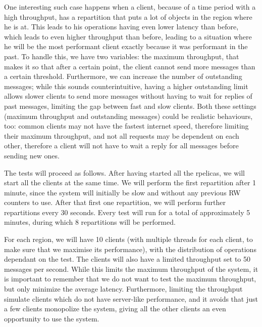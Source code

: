One interesting such case happens when a client, because of a time period with a high throughput, has a repartition that puts a lot of objects in the region where he is at. This leads to his operations having even lower latency than before, which leads to even higher throughput than before, leading to a situation where he will be the most performant client exactly because it was performant in the past. To handle this, we have two variables: the maximum throughput, that makes it so that after a certain point, the client cannot send more messages than a certain threshold. Furthermore, we can increase the number of outstanding messages; while this sounds counterintuitive, having a higher outstanding limit allows slower clients to send more messages without having to wait for replies of past messages, limiting the gap between fast and slow clients. Both these settings (maximum throughput and outstanding messages) could be realistic behaviours, too: common clients may not have the fastest internet speed, therefore limiting their maximum throughput, and not all requests may be dependent on each other, therefore a client will not have to wait a reply for all messages before sending new ones.

The tests will proceed as follows. After having started all the rpelicas, we will start all the clients at the same time. We will perform the first repartition after 1 minute, since the system will initially be slow and without any previous RW counters to use. After that first one repartition, we will perform further repartitions every 30 seconds. Every test will run for a total of approximately 5 minutes, during which 8 repartitions will be performed.

For each region, we will have 10 clients (with multiple threads for each client, to make sure that we maximise its performance), with the distribution of operations dependant on the test. The clients will also have a limited throughput set to 50 messages per second. While this limits the maximum throughput of the system, it is important to remember that we do not want to test the maximum throughput, but only minimize the average latency. Furthermore, limiting the throughput simulate clients which do not have server-like performance, and it avoids that just a few clients monopolize the system, giving all the other clients an even opportunity to use the system.

